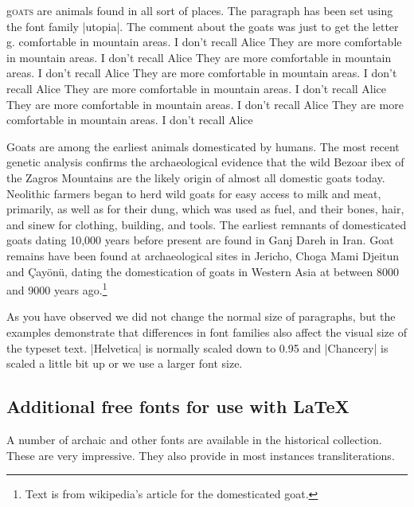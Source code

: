 \par\leavevmode

\lettrine[lines=5, lhang=0.1,lraise=0.28,findent=1pt]{g}{oats} are animals found in all sort of places. The paragraph has been set using the font family |utopia|. The comment about the goats was just to get the letter g.
comfortable in mountain areas. I don't recall Alice  They are more
comfortable in mountain areas. I don't recall Alice   They are more
comfortable in mountain areas. I don't recall Alice   They are more
comfortable in mountain areas. I don't recall Alice  They are more
comfortable in mountain areas. I don't recall Alice  They are more
comfortable in mountain areas. I don't recall Alice  They are more
comfortable in mountain areas. I don't recall Alice 

\medskip



\lettrine{G}{o}ats are among the earliest animals domesticated by humans. The most recent genetic analysis confirms the archaeological evidence that the wild Bezoar ibex of the Zagros Mountains are the likely origin of almost all domestic goats today. Neolithic farmers began to herd wild goats for easy access to milk and meat, primarily, as well as for their dung, which was used as fuel, and their bones, hair, and sinew for clothing, building, and tools. The earliest remnants of domesticated goats dating 10,000 years before present are found in Ganj Dareh in Iran. Goat remains have been found at archaeological sites in Jericho, Choga Mami Djeitun and Çay\"on\"u, dating the domestication of goats in Western Asia at between 8000 and 9000 years ago.\footnote{Text is from wikipedia's article for the domesticated goat.}

\bgroup


As you have observed we did not change the normal size of paragraphs, but the examples demonstrate that differences in font families also affect the visual size of the typeset text. |Helvetica| is normally scaled down to 0.95 and |Chancery| is scaled a little bit up or we use a larger font size.
\egroup



\subsection{Additional free fonts for use with \LaTeX}

A number of archaic and other fonts are available in the \latexe historical collection. These are very impressive. They also provide in most instances transliterations.

